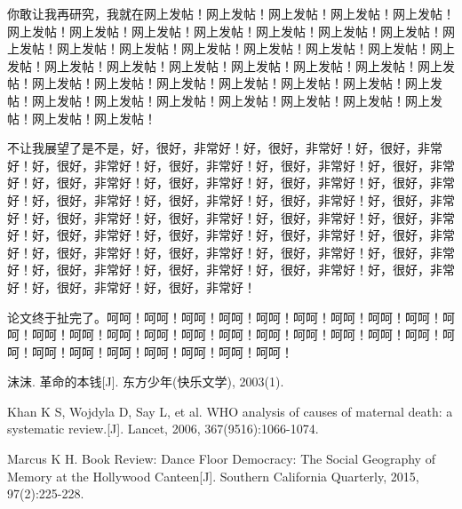 \documentclass[a4paper,12pt]{book} %
\begin{document}
你敢让我再研究，我就在网上发帖！网上发帖！网上发帖！网上发帖！网上发帖！网上发帖！网上发帖！网上发帖！网上发帖！网上发帖！网上发帖！网上发帖！网上发帖！网上发帖！网上发帖！网上发帖！网上发帖！网上发帖！网上发帖！网上发帖！网上发帖！网上发帖！网上发帖！网上发帖！网上发帖！网上发帖！网上发帖！网上发帖！网上发帖！网上发帖！网上发帖！网上发帖！网上发帖！网上发帖！网上发帖！网上发帖！网上发帖！网上发帖！网上发帖！网上发帖！网上发帖！网上发帖！网上发帖！

不让我展望了是不是，好，很好，非常好！好，很好，非常好！好，很好，非常好！好，很好，非常好！好，很好，非常好！好，很好，非常好！好，很好，非常好！好，很好，非常好！好，很好，非常好！好，很好，非常好！好，很好，非常好！好，很好，非常好！好，很好，非常好！好，很好，非常好！好，很好，非常好！好，很好，非常好！好，很好，非常好！好，很好，非常好！好，很好，非常好！好，很好，非常好！好，很好，非常好！好，很好，非常好！好，很好，非常好！好，很好，非常好！好，很好，非常好！好，很好，非常好！好，很好，非常好！好，很好，非常好！好，很好，非常好！好，很好，非常好！好，很好，非常好！好，很好，非常好！好，很好，非常好！

论文终于扯完了。呵呵！呵呵！呵呵！呵呵！呵呵！呵呵！呵呵！呵呵！呵呵！呵呵！呵呵！呵呵！呵呵！呵呵！呵呵！呵呵！呵呵！呵呵！呵呵！呵呵！呵呵！呵呵！呵呵！呵呵！呵呵！呵呵！呵呵！呵呵！呵呵！

\clearpage{\pagestyle{empty}\cleardoublepage}




\begin{thebibliography}{99}

 沫沫. 革命的本钱[J]. 东方少年(快乐文学), 2003(1).

 Khan K S, Wojdyla D, Say L, et al. WHO analysis of causes of maternal death: a systematic review.[J]. Lancet, 2006, 367(9516):1066-1074.

 Marcus K H. Book Review: Dance Floor Democracy: The Social Geography of Memory at the Hollywood Canteen[J]. Southern California Quarterly, 2015, 97(2):225-228.

\end{thebibliography}
\end{document}
